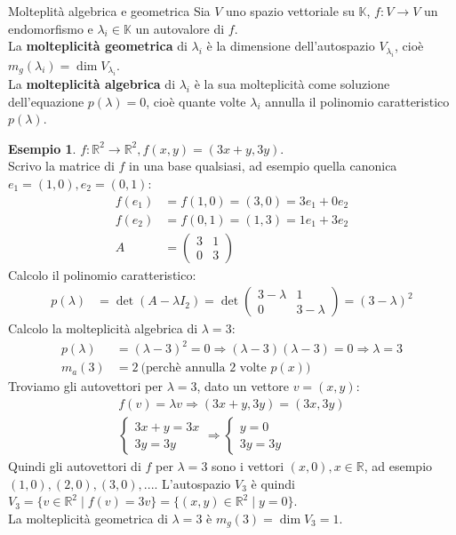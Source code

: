 \documentclass[a4paper]{article}
\theoremstyle{definition}
\newtheorem*{es}{Esempio}
\begin{document}
	\begin{deff}{Molteplità algebrica e geometrica}{}
		Sia $V$ uno spazio vettoriale su $\mathbb{K}$, $f: V \to V$ un endomorfismo e $\lambda_i \in \mathbb{K}$ un autovalore di $f$. \\
		La \textbf{molteplicità geometrica} di $\lambda_i$ è la dimensione dell'autospazio $V_{\lambda_i}$, cioè $m_g(\lambda_i) = \dim V_{\lambda_i}$. \\
		La \textbf{molteplicità algebrica} di $\lambda_i$ è la sua molteplicità come soluzione dell'equazione $p(\lambda) = 0$, cioè quante volte $\lambda_i$ annulla il polinomio caratteristico $p(\lambda)$.
	\end{deff}
	\begin{es}
		$f: \mathbb{R}^2 \to \mathbb{R}^2, f(x, y) = (3x + y, 3y)$. \\
		Scrivo la matrice di $f$ in una base qualsiasi, ad esempio quella canonica $e_1 = (1, 0), e_2 = (0, 1)$:
		\begin{align*}
			f(e_1) &= f(1, 0) = (3, 0) = 3e_1 + 0e_2 \\
			f(e_2) &= f(0, 1) = (1, 3) = 1e_1 + 3e_2 \\
			A &= \begin{pmatrix}
				3 & 1 \\
				0 & 3
			\end{pmatrix}
		\end{align*}
		Calcolo il polinomio caratteristico:
		\begin{align*}
			p(\lambda) &= \det(A - \lambda I_2) = \det \begin{pmatrix}
				3 - \lambda & 1 \\
				0 & 3 - \lambda
			\end{pmatrix} = (3 - \lambda)^2
		\end{align*}
		Calcolo la molteplicità algebrica di $\lambda = 3$:
		\begin{align*}
			p(\lambda) &= (\lambda - 3)^2 = 0 \Rightarrow (\lambda - 3)(\lambda - 3) = 0 \Rightarrow \lambda = 3 \\
			m_a(3) &= 2 \ \text{(perchè annulla 2 volte $p(x)$)}
		\end{align*}
		Troviamo gli autovettori per $\lambda = 3$, dato un vettore $v = (x, y)$:
		\begin{align*}
			f(v) = \lambda v \Rightarrow (3x + y, 3y) = (3x, 3y) \\
			\begin{cases}
				3x + y = 3x \\
				3y = 3y
			\end{cases} \Rightarrow \begin{cases}
				y = 0 \\
				3y = 3y
			\end{cases}
		\end{align*}
		Quindi gli autovettori di $f$ per $\lambda = 3$ sono i vettori $(x, 0), x \in \mathbb{R}$, ad esempio $(1, 0), (2, 0), (3, 0), ...$.
		L'autospazio $V_3$ è quindi $V_3 = \{v \in \mathbb{R}^2 \mid f(v) = 3v\} = \{(x, y) \in \mathbb{R}^2 \mid y = 0\}$. \\
		La molteplicità geometrica di $\lambda = 3$ è $m_g(3) = \dim V_3 = 1$.
	\end{es}
\end{document}
